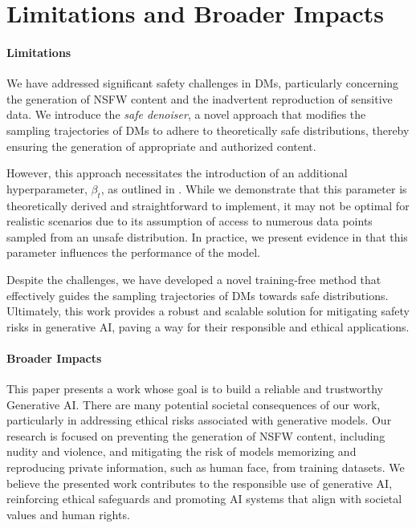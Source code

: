 \section{Limitations and Broader Impacts}
\label{sec:limitation}

\paragraph{Limitations}
We have addressed significant safety challenges in DMs, particularly concerning the generation of NSFW content and the inadvertent reproduction of sensitive data. 
We introduce the \textit{safe denoiser}, a novel approach that modifies the sampling trajectories of DMs to adhere to theoretically safe distributions, thereby ensuring the generation of appropriate and authorized content. 

However, this approach necessitates the introduction of an additional hyperparameter, $\beta_t$, as outlined in . 
While we demonstrate that this parameter is theoretically derived and straightforward to implement, it may not be optimal for realistic scenarios due to its assumption of access to numerous data points sampled from an unsafe distribution. 
In practice, we present evidence in  that this parameter influences the performance of the model.

Despite the challenges, we have developed a novel training-free method that effectively guides the sampling trajectories of DMs towards safe distributions. 
Ultimately, this work provides a robust and scalable solution for mitigating safety risks in generative AI, paving a way for their responsible and ethical applications.


\paragraph{Broader Impacts}
This paper presents a work whose goal is to build a reliable and trustworthy Generative AI. 
There are many potential societal consequences of our work, particularly in addressing ethical risks associated with generative models. 
Our research is focused on preventing the generation of NSFW content, including nudity and violence, and mitigating the risk of models memorizing and reproducing private information, such as human face, from training datasets. 
We believe the presented work contributes to the responsible use of generative AI, reinforcing ethical safeguards and promoting AI systems that align with societal values and human rights.
